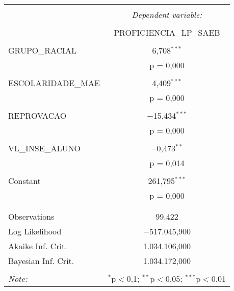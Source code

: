 \begin{table}[!htbp] \centering 
  \caption{} 
  \label{} 
\begin{tabular}{@{\extracolsep{5pt}}lc} 
\\[-1.8ex]\hline 
\hline \\[-1.8ex] 
 & \multicolumn{1}{c}{\textit{Dependent variable:}} \\ 
\cline{2-2} 
\\[-1.8ex] & PROFICIENCIA\_LP\_SAEB \\ 
\hline \\[-1.8ex] 
 GRUPO\_RACIAL & 6,708$^{***}$ \\ 
  & p = 0,000 \\ 
  & \\ 
 ESCOLARIDADE\_MAE & 4,409$^{***}$ \\ 
  & p = 0,000 \\ 
  & \\ 
 REPROVACAO & $-$15,434$^{***}$ \\ 
  & p = 0,000 \\ 
  & \\ 
 VL\_INSE\_ALUNO & $-$0,473$^{**}$ \\ 
  & p = 0,014 \\ 
  & \\ 
 Constant & 261,795$^{***}$ \\ 
  & p = 0,000 \\ 
  & \\ 
\hline \\[-1.8ex] 
Observations & 99.422 \\ 
Log Likelihood & $-$517.045,900 \\ 
Akaike Inf. Crit. & 1.034.106,000 \\ 
Bayesian Inf. Crit. & 1.034.172,000 \\ 
\hline 
\hline \\[-1.8ex] 
\textit{Note:}  & \multicolumn{1}{r}{$^{*}$p$<$0,1; $^{**}$p$<$0,05; $^{***}$p$<$0,01} \\ 
\end{tabular} 
\end{table} 

